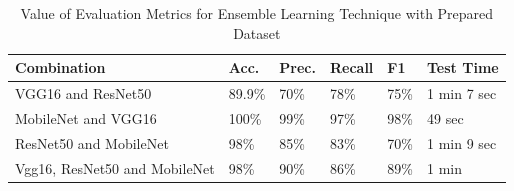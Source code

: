 \begin{table}[h]
\centering
\caption{Value of Evaluation Metrics for Ensemble Learning Technique with Prepared Dataset}
\captionsetup[table]{skip=10pt}


{
\begin{tabular}{llllll}
\hline
Combination & Acc.   & Prec.  & Recall & F1 & Test Time   \\ \hline
VGG16 and ResNet50        & 89.9\%  & 70\% & 78\%  & 75\% & 1 min 7 sec\\
MobileNet and VGG16         & 100\% & 99\% & 97\%  & 98\% & 49 sec\\
ResNet50 and MobileNet     & 98\% & 85\% & 83\% & 70\% & 1 min 9 sec\\
Vgg16, ResNet50 and MobileNet    & 98\% & 90\% & 86\% & 89\% & 1 min\\
 \hline
\end{tabular}
}
\label{table:ensemble-raw}
\end{table}